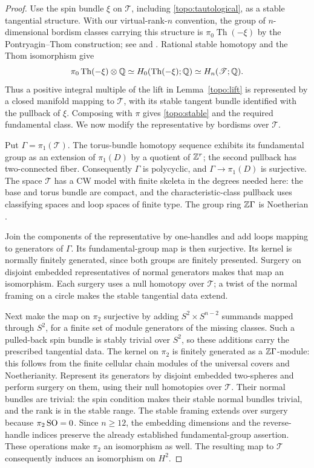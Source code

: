 \begin{proof}
Use the spin bundle $\xi$ on $\mathscr T$, including
\eqref{topo:tautological}, as a stable tangential structure.
With our virtual-rank-$n$ convention, the group of $n$-dimensional
bordism classes carrying this structure is
$\pi_0\operatorname{Th}(-\xi)$ by the Pontryagin--Thom construction;
see \cite{Thom1954} and \cite[Section~2.3]{RathelFournier2024}.
Rational stable homotopy and the Thom isomorphism give
\[
 \pi_0\operatorname{Th}(-\xi)\otimes\mathbb Q
 \simeq H_0(\operatorname{Th}(-\xi);\mathbb Q)
 \simeq H_n(\mathscr T;\mathbb Q).
\]
Thus a positive integral multiple of the lift in Lemma~\ref{topo:lift}
is represented
by a closed manifold mapping to $\mathscr T$, with its stable tangent
bundle identified with the pullback of $\xi$.  Composing with $\pi$
gives \eqref{topo:stable} and the required fundamental class.  We now
modify the representative by bordisms over $\mathscr T$.

Put $\Gamma=\pi_1(\mathscr T)$.  The torus-bundle homotopy sequence
exhibits its fundamental group as an extension of $\pi_1(D)$ by a
quotient of $\mathbb Z^r$; the second pullback has two-connected fiber.
Consequently $\Gamma$ is polycyclic, and $\Gamma\to\pi_1(D)$ is
surjective.  The space $\mathscr T$ has a CW model with finite skeleta
in the degrees needed here: the base and torus bundle are compact,
and the characteristic-class pullback uses classifying spaces and
loop spaces of finite type.  The group ring $\mathbb Z\Gamma$ is
Noetherian \cite{Hall1954}.

Join the components of the representative by one-handles and add
loops mapping to generators of $\Gamma$.  Its fundamental-group map
is then surjective.  Its kernel is normally finitely generated,
since both groups are finitely presented.  Surgery on disjoint
embedded representatives of normal generators makes that map an
isomorphism.  Each surgery uses a null homotopy over $\mathscr T$;
a twist of the normal framing on a circle makes the stable tangential
data extend.

Next make the map on $\pi_2$ surjective by adding
$S^2\times S^{n-2}$ summands mapped through $S^2$, for a finite set
of module generators of the missing classes.  Such a pulled-back
spin bundle is stably trivial over $S^2$, so these additions carry
the prescribed tangential data.  The kernel on $\pi_2$ is finitely
generated as a $\mathbb Z\Gamma$-module: this follows from the finite
cellular chain modules of the universal covers and Noetherianity.
Represent its generators by disjoint embedded two-spheres and
perform surgery on them, using their null homotopies over
$\mathscr T$.  Their normal bundles are trivial: the spin condition
makes their stable normal bundles trivial, and the rank is in the
stable range.  The stable framing extends over surgery because
$\pi_2\operatorname{SO}=0$.  Since $n\geq12$, the embedding dimensions and the
reverse-handle indices preserve the already established
fundamental-group assertion.  These operations make $\pi_2$ an
isomorphism as well.  The resulting map to $\mathscr T$ consequently
induces an isomorphism on $H^2$.


\end{proof}
